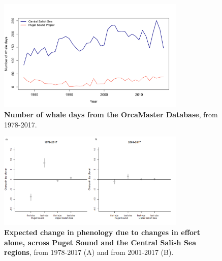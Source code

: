 \documentclass{article}
\begin{document}
\begin{figure}[p]
\includegraphics[width=0.8\textwidth]{../analyses/figures/OrcaPhenPlots/whaledays_assumeSRKW2regs.pdf} 
\caption{\textbf{Number of whale days from the OrcaMaster Database}, from 1978-2017. }
\label{fig:wdays}
\end{figure}


\begin{figure}[p]
\includegraphics[width=0.8\textwidth]{../analyses/orcaphen/figures/simeffortonly2panels.png} 
\caption{\textbf{Expected change in phenology due to changes in effort alone, across Puget Sound and the Central Salish Sea regions}, from 1978-2017 (A) and from 2001-2017 (B). }
\label{fig:simeffort}
\end{figure}
\end{document}
